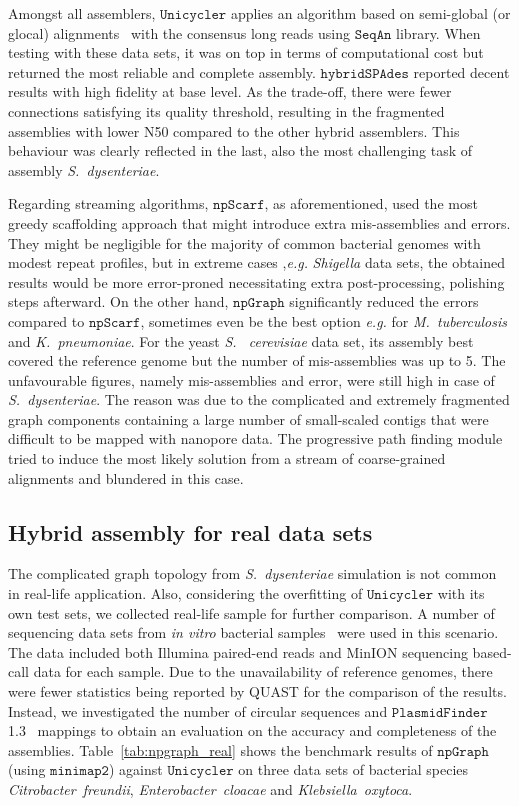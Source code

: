 \documentclass[10pt,twocolumn,twoside]{genpaper}
\newcommand{\npscarf}{$\mathtt{npScarf}$}
\newcommand{\npgraph}{$\mathtt{npGraph}$}
\newcommand{\unicycler}{$\mathtt{Unicycler}$}
\newcommand{\minimap}{$\mathtt{minimap2}$}
\newcommand{\kp}{\emph{K.~pneumoniae}}
\newcommand{\EG}{\emph{e.g.}}
\begin{document}
Amongst all assemblers, \unicycler{} applies an algorithm based on semi-global (or glocal) alignments~\cite{Brudno2003glocal} with the consensus long reads using $\mathtt{SeqAn}$ library. When testing with these data sets, it was on top in terms of computational cost but returned the most reliable and complete assembly.
$\mathtt{hybridSPAdes}$ reported decent results with high fidelity at base level. As the trade-off, there were fewer connections satisfying its quality threshold, resulting in the fragmented assemblies with lower N50 compared to the other hybrid assemblers. This behaviour was clearly reflected in the last, also the most challenging task of assembly \emph{S.~dysenteriae}.

Regarding streaming algorithms, \npscarf{}, as aforementioned, used the most greedy scaffolding approach that might introduce extra mis-assemblies and errors.
They might be negligible for the majority of common bacterial genomes with modest repeat profiles, but in extreme cases ,\EG{} \emph{Shigella} data sets, the obtained results would be more error-proned necessitating extra post-processing, polishing steps afterward.
On the other hand, \npgraph{} significantly reduced the errors compared to \npscarf{}, sometimes even be the best option \EG{} for \emph{M.~tuberculosis} and \kp{}.  
For the yeast \emph{S.~ cerevisiae} data set, its assembly best covered the reference genome but the number of mis-assemblies was up to 5.
The unfavourable figures, namely mis-assemblies and error, were still high in case of \emph{S.~dysenteriae}.
The reason was due to the complicated and extremely fragmented graph components containing a large number of small-scaled contigs that were difficult to be mapped with nanopore data. The progressive path finding module tried to induce the most likely solution from a stream of coarse-grained alignments and blundered in this case.

\subsection*{Hybrid assembly for real data sets}
The complicated graph topology from \emph{S.~dysenteriae} simulation is not common in real-life application. Also, considering the overfitting of \unicycler{} with its own test sets, we collected real-life sample for further comparison.
A number of sequencing data sets from \emph{in vitro} bacterial samples~\cite{George2017M14} were used in this scenario.
The data included both Illumina paired-end reads and MinION sequencing based-call data for each sample.
Due to the unavailability of reference genomes, there were fewer statistics being reported by QUAST for the comparison of the results. 
Instead, we investigated the number of circular sequences and $\mathtt{PlasmidFinder}$ 1.3~\cite{Carattoli2014} mappings to obtain an evaluation on the accuracy and completeness of the assemblies.
Table~\ref{tab:npgraph_real} shows the benchmark results of \npgraph{} (using \minimap{}) against \unicycler{} on three data sets of bacterial species \emph{Citrobacter~freundii}, \emph{Enterobacter~cloacae} and \emph{Klebsiella~oxytoca}. 
\end{document}
